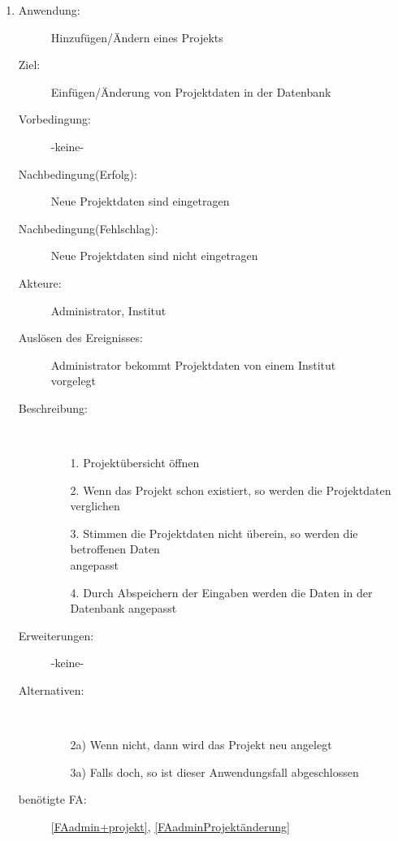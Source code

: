 \documentclass[parskip=full]{scrartcl}
\newcommand{\swtLabel}[1]{\textbf{/#1\arabic*0/}}
\begin{document}
\begin{enumerate} [label=\swtLabel{A}]
  \item
    \begin{description}
  	\item[Anwendung:] Hinzufügen/Ändern eines Projekts
  	\item[Ziel:] Einfügen/Änderung von Projektdaten in der Datenbank
  	\item[Vorbedingung:] -keine-
  	\item[Nachbedingung(Erfolg):] Neue Projektdaten sind eingetragen
  	\item[Nachbedingung(Fehlschlag):] Neue Projektdaten sind nicht eingetragen
  	\item[Akteure:] Administrator, Institut
  	\item[Auslösen des Ereignisses:] Administrator bekommt Projektdaten von einem
  	Institut\\ vorgelegt
  	\item[Beschreibung:]~
  	\begin{enumerate} 
  	  \item[1.] Projektübersicht öffnen
  	  \item[2.] Wenn das Projekt schon existiert, so werden die Projektdaten
  	  verglichen
  	  \item[3.] Stimmen die Projektdaten nicht überein, so werden die betroffenen
  	  Daten\\ angepasst
  	  \item[4.] Durch Abspeichern der Eingaben werden die Daten in der Datenbank
  	  angepasst
  	\end{enumerate}
  	\item[Erweiterungen:] -keine-
  	\item[Alternativen:]~
  	\begin{enumerate}
  	  \item[2a)] Wenn nicht, dann wird das Projekt neu angelegt
  	  \item[3a)] Falls doch, so ist dieser Anwendungsfall abgeschlossen
  	\end{enumerate} 
  	\item[benötigte FA:] \ref{FAadmin+projekt}, \ref{FAadminProjektänderung}
  \end{description}
   

\end{enumerate}
\end{document}
